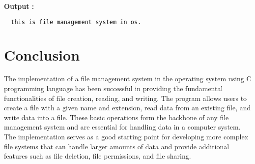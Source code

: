 \documentclass[journal,onecolumn]{IEEEtran}
\begin{document}
\textbf{Output :}
\begin{verbatim}
  this is file management system in os.
\end{verbatim}




\section{Conclusion}
The implementation of a file management system in the operating system using C programming language has been successful in providing the fundamental functionalities of file creation, reading, and writing. The program allows users to create a file with a given name and extension, read data from an existing file, and write data into a file. These basic operations form the backbone of any file management system and are essential for handling data in a computer system. The implementation serves as a good starting point for developing more complex file systems that can handle larger amounts of data and provide additional features such as file deletion, file permissions, and file sharing.
\end{document}
